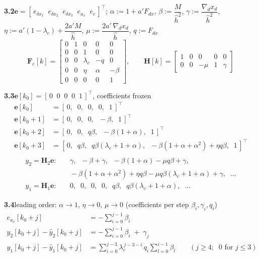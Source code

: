 \documentclass[11pt,a4paper]{ctexart}
\newcommand{\lc}{\lambda_c}
\begin{document}
\textbf{3.2}\quad $\mathbf{e} = [\,e_{\delta x_1}\;\; e_{\delta x_2}\;\; e_{\delta x_3}\;\; e_{a_x}\;\; e_c\,]^{\top}$;\quad
$\alpha := 1 + a' F_{dx}$, \; $\beta := \dfrac{M}{\hat h^{2}}$, \; $\gamma := \dfrac{\nabla_d x_d}{\hat h^{2}}$, \;
$\eta := a'(1-\lc) + \dfrac{2a'M}{\hat h}$, \; $\mu := \dfrac{2a'\,\nabla_d x_d}{\hat h}$, \; $q := F_{dx}$
\[
\mathbf{F}_e[k] =
\begin{bmatrix}
0 & 1 & 0 & 0 & 0 \\
0 & 0 & 1 & 0 & 0 \\
0 & 0 & \lc & -q & 0 \\
0 & 0 & \eta & \alpha & -\beta \\
0 & 0 & 0 & 0 & 1
\end{bmatrix}, \qquad
\mathbf{H}[k] =
\begin{bmatrix}
1 & 0 & 0 & 0 & 0 \\
0 & 0 & -\mu & 1 & \gamma
\end{bmatrix}
\]

\textbf{3.3}\quad $\mathbf{e}[k_0] = [\,0\;\;0\;\;0\;\;0\;\;1\,]^{\top}$, coefficients frozen
\[
\begin{aligned}
\mathbf{e}[k_0]   &= [\,0,\;\; 0,\;\; 0,\;\; 0,\;\; 1\,]^{\top} \\
\mathbf{e}[k_0+1] &= [\,0,\;\; 0,\;\; 0,\;\; -\beta,\;\; 1\,]^{\top} \\
\mathbf{e}[k_0+2] &= [\,0,\;\; 0,\;\; q\beta,\;\; -\beta(1+\alpha),\;\; 1\,]^{\top} \\
\mathbf{e}[k_0+3] &= [\,0,\;\; q\beta,\;\; q\beta(\lc + 1 + \alpha),\;\; -\beta(1+\alpha+\alpha^{2}) + \eta q\beta,\;\; 1\,]^{\top} \\
\end{aligned}
\]
\[
\begin{aligned}
y_2 = \mathbf{H}_2\mathbf{e}:&\quad \gamma,\;\; -\beta+\gamma,\;\; -\beta(1+\alpha) - \mu q\beta + \gamma, \\
&\quad -\beta(1+\alpha+\alpha^{2}) + \eta q\beta - \mu q\beta(\lc+1+\alpha) + \gamma,\;\; \dots \\
y_1 = \mathbf{H}_1\mathbf{e}:&\quad 0,\;\; 0,\;\; 0,\;\; 0,\;\; q\beta,\;\; q\beta(\lc+1+\alpha),\;\; \dots
\end{aligned}
\]

\textbf{3.4}\quad leading order: $\alpha \to 1$, $\eta \to 0$, $\mu \to 0$ (coefficients per step $\beta_i, \gamma_i, q_i$)
\[
\begin{aligned}
e_{a_x}[k_0+j] &= -\sum_{i=0}^{j-1} \beta_i \\
y_2[k_0+j] - \hat y_2[k_0+j] &= -\sum_{i=0}^{j-1} \beta_i \;+\; \gamma_j \\
y_1[k_0+j] - \hat y_1[k_0+j] &= \sum_{i=0}^{j-3} \lc^{\,j-3-i}\, q_i \sum_{l=0}^{i-1} \beta_l \qquad (j \ge 4;\;\; 0 \text{ for } j \le 3)
\end{aligned}
\]
\end{document}
